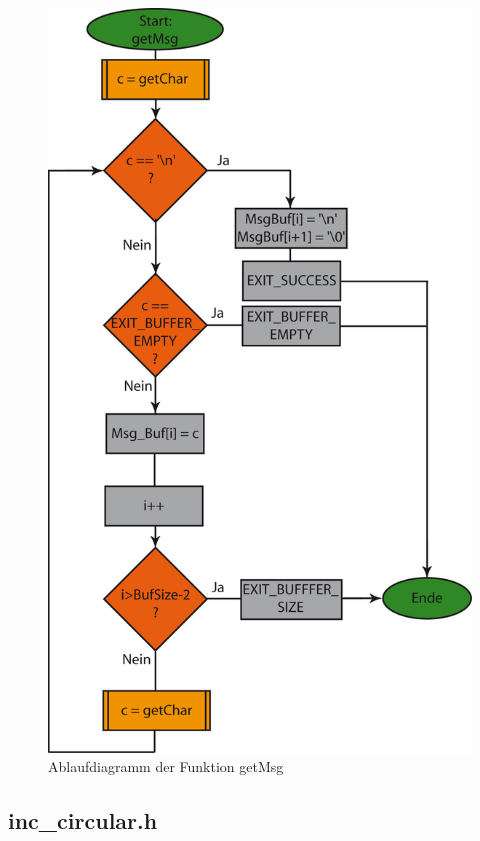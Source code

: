 \begin{figure}[h]
\includegraphics[scale = 0.8]{./getMsg.png}
\hspace{-14pt}
\caption{Ablaufdiagramm der Funktion getMsg}
\end{figure} 








\subsection{inc\_circular.h}










